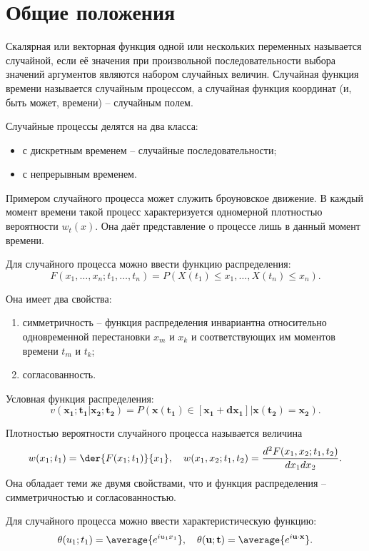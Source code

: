 \section{Общие положения}
Скалярная или векторная функция одной или нескольких переменных называется
случайной, если её значения при произвольной последовательности выбора значений
аргументов являются набором случайных величин. Случайная функция времени
называется случайным процессом, а случайная функция координат (и, быть может,
времени) -- случайным полем.

Случайные процессы делятся на два класса:
\begin{itemize}
    \item с дискретным временем -- случайные последовательности;
    \item с непрерывным временем.
\end{itemize}

Примером случайного процесса может служить броуновское движение. В каждый момент
времени такой процесс характеризуется одномерной плотностью вероятности
\( w_t(x) \). Она даёт представление о процессе лишь в данный момент времени.

Для случайного процесса можно ввести функцию распределения:
\[
    F(x_1, \ldots, x_n; t_1, \ldots, t_n) =
        P(X(t_1) \le x_1, \ldots, X(t_n) \le x_n).
\]

Она имеет два свойства:
\begin{enumerate}
    \item симметричность -- функция распределения инвариантна относительно
        одновременной перестановки \( x_m \) и \( x_k \) и соответствующих
        им моментов времени \( t_m \) и \( t_k \);
    \item согласованность.
\end{enumerate}

Условная функция распределения:
\[
    v(\mathbf{x_1};\mathbf{t_1}|\mathbf{x_2};\mathbf{t_2}) =
    P(\mathbf{x}(\mathbf{t_1})\in[\mathbf{x_1}+\mathbf{dx_1}]|
        \mathbf{x}(\mathbf{t_2})=\mathbf{x_2}).
\]

Плотностью вероятности случайного процесса называется величина
\[
    w(x_1;t_1) = \der{F(x_1;t_1)}{x_1},\quad
    w(x_1,x_2;t_1,t_2) = \frac{d^2F(x_1,x_2;t_1,t_2)}{dx_1 dx_2}.
\]
Она обладает теми же двумя свойствами, что и функция распределения --
симметричностью и согласованностью.

Для случайного процесса можно ввести характеристическую функцию:
\[
    \theta(u_1;t_1) = \average{e^{iu_1x_1}},\quad
    \theta(\mathbf{u};\mathbf{t}) = \average{e^{i\mathbf{u}\cdot\mathbf{x}}}.
\]


